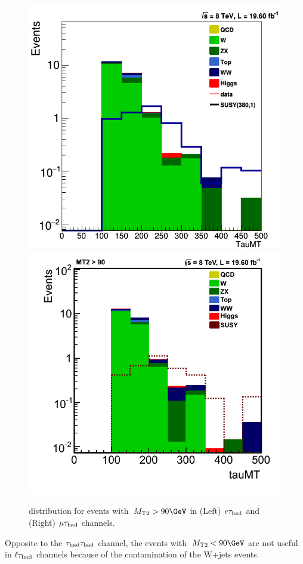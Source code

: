 \begin{figure}[htbp]
\centering
\includegraphics[angle=0,scale=0.35]{SelectionEleTau/TauMT.png}
\includegraphics[angle=0,scale=0.35]{SelectionMuTau/tauMT_MuTau.png}
\caption{\tauMT distribution for events with $\mttwo>90\GeV$ in (Left) $e\tau_{\rm had}$ and (Right) $\mu\tau_{\rm had}$ channels.}
\label{fig:taumtleptontau}
\end{figure}
Opposite to the $\tau_{\rm had}\tau_{\rm had}$ channel, the events with $\mttwo<90 \GeV$ are not useful in $\ell\tau_{\rm had}$ channels because of the contamination of the W+jets events.
